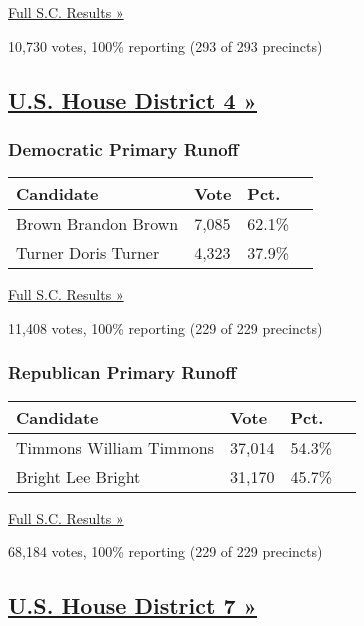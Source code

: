 \href{https://www.nytimes3xbfgragh.onion/elections/results/south-carolina}{Full
S.C. Results »}

10,730 votes, 100\% reporting (293 of 293 precincts)

\hypertarget{us-house-district-4-}{%
\subsection{\texorpdfstring{\href{https://www.nytimes3xbfgragh.onion/elections/results/south-carolina-house-district-4-primary-runoff-election}{U.S.
House District 4
»}}{U.S. House District 4 »}}\label{us-house-district-4-}}

\hypertarget{democratic-primary-runoff-1}{%
\subsubsection{Democratic Primary
Runoff}\label{democratic-primary-runoff-1}}

\begin{longtable}[]{@{}llll@{}}
\toprule
Candidate & Vote & Pct. &\tabularnewline
\midrule
\endhead
 Brown Brandon Brown & 7,085 & 62.1\% &\tabularnewline
 Turner Doris Turner & 4,323 & 37.9\% &\tabularnewline
\bottomrule
\end{longtable}

\href{https://www.nytimes3xbfgragh.onion/elections/results/south-carolina}{Full
S.C. Results »}

11,408 votes, 100\% reporting (229 of 229 precincts)

\hypertarget{republican-primary-runoff-1}{%
\subsubsection{Republican Primary
Runoff}\label{republican-primary-runoff-1}}

\begin{longtable}[]{@{}llll@{}}
\toprule
Candidate & Vote & Pct. &\tabularnewline
\midrule
\endhead
 Timmons William Timmons & 37,014 & 54.3\% &\tabularnewline
 Bright Lee Bright & 31,170 & 45.7\% &\tabularnewline
\bottomrule
\end{longtable}

\href{https://www.nytimes3xbfgragh.onion/elections/results/south-carolina}{Full
S.C. Results »}

68,184 votes, 100\% reporting (229 of 229 precincts)

\hypertarget{us-house-district-7-}{%
\subsection{\texorpdfstring{\href{https://www.nytimes3xbfgragh.onion/elections/results/south-carolina-house-district-7-primary-runoff-election}{U.S.
House District 7
»}}{U.S. House District 7 »}}\label{us-house-district-7-}}

